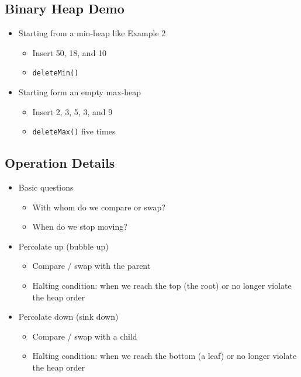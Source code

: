 \documentclass[
  10pt,
  english,
  letterpaper,
,tablecaptionabove
]{scrartcl}
\newcommand{\passthrough}[1]{#1}
\providecommand{\tightlist}{%
  \setlength{\itemsep}{0pt}\setlength{\parskip}{0pt}}
\begin{document}
\hypertarget{binary-heap-demo}{%
\subsection{Binary Heap Demo}\label{binary-heap-demo}}

\begin{itemize}
\tightlist
\item
  Starting from a min-heap like Example 2

  \begin{itemize}
  \tightlist
  \item
    Insert 50, 18, and 10
  \item
    \passthrough{\lstinline!deleteMin()!}
  \end{itemize}
\item
  Starting form an empty max-heap

  \begin{itemize}
  \tightlist
  \item
    Insert 2, 3, 5, 3, and 9
  \item
    \passthrough{\lstinline!deleteMax()!} five times
  \end{itemize}
\end{itemize}

\hypertarget{operation-details}{%
\subsection{Operation Details}\label{operation-details}}

\begin{itemize}
\tightlist
\item
  Basic questions

  \begin{itemize}
  \tightlist
  \item
    With whom do we compare or swap?
  \item
    When do we stop moving?
  \end{itemize}
\item
  Percolate up (bubble up)

  \begin{itemize}
  \tightlist
  \item
    Compare / swap with the parent
  \item
    Halting condition: when we reach the top (the root) or no longer
    violate the heap order
  \end{itemize}
\item
  Percolate down (sink down)

  \begin{itemize}
  \tightlist
  \item
    Compare / swap with a child
  \item
    Halting condition: when we reach the bottom (a leaf) or no longer
    violate the heap order
  \end{itemize}
\end{itemize}
\end{document}
